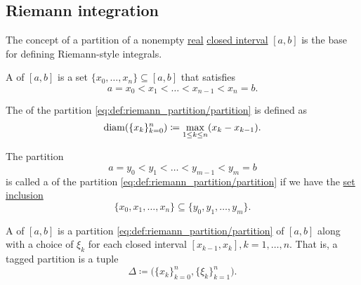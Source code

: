 \subsection{Riemann integration}\label{subsec:riemann_integration}

\begin{definition}\label{def:riemann_partition}
  The concept of a partition of a nonempty \hyperref[def:real_numbers]{real} \hyperref[def:total_order_interval/closed]{closed interval} \( [a, b] \) is the base for defining Riemann-style integrals.

  \begin{DefEnum}
    A  of \( [a, b] \) is a set \( \{ x_0, \ldots, x_n \} \subseteq [a, b] \) that satisfies
    \begin{equation}\label{eq:def:riemann_partition/partition}
      a = x_0 < x_1 < \ldots < x_{n-1} < x_n = b.
    \end{equation}

    The  of the partition \eqref{eq:def:riemann_partition/partition} is defined as
    \begin{equation}\label{eq:def:riemann_partition/diameter}
      \operatorname{diam}(\{ x_k \}_{k=0}^n) \coloneqq \max_{1 \leq k \leq n} (x_k - x_{k-1}).
    \end{equation}

     The partition
    \begin{equation*}
      a = y_0 < y_1 < \ldots < y_{m-1} < y_m = b
    \end{equation*}
    is called a  of the partition \eqref{eq:def:riemann_partition/partition} if we have the \hyperref[def:subset]{set inclusion}
    \begin{equation}\label{eq:def:riemann_partition/refinement/inclusion}
      \{ x_0, x_1, \ldots, x_n \} \subseteq \{ y_0, y_1, \ldots, y_m \}.
    \end{equation}

    A  of \( [a, b] \) is a partition \eqref{eq:def:riemann_partition/partition} of \( [a, b] \) along with a choice of \( \xi_k \) for each closed interval \( [x_{k-1}, x_k], k = 1, \ldots, n \). That is, a tagged partition is a tuple
    \begin{equation}\label{eq:def:riemann_partition/tagged}
      \Delta \coloneqq \Big( \{ x_k \}_{k=0}^n, \{ \xi_k \}_{k=1}^n \Big).
    \end{equation}


\end{DefEnum}
\end{definition}
